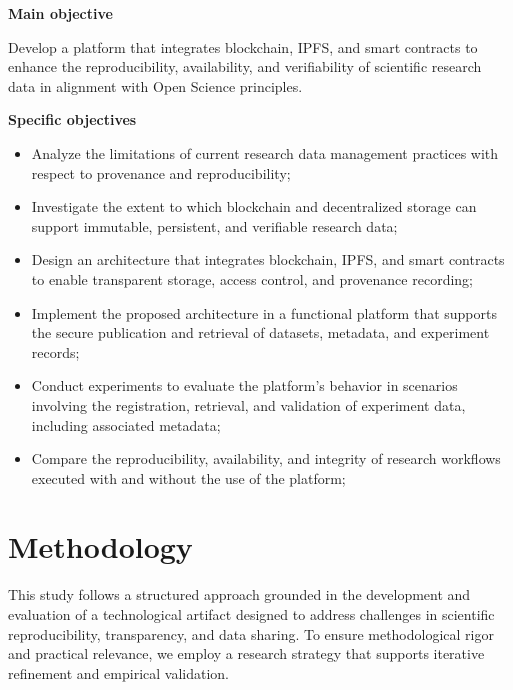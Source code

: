 \documentclass[final]{rc-book-2.14}
\begin{document}
\textbf{Main objective}

\begin{citeverbatim}

    Develop a platform that integrates blockchain, IPFS, and smart contracts to enhance the reproducibility, availability, and verifiability of scientific research data in alignment with Open Science principles.

\end{citeverbatim}

\textbf{Specific objectives}
\begin{itemize}
    \item Analyze the limitations of current research data management practices with respect to provenance and reproducibility;

    \item Investigate the extent to which blockchain and decentralized storage can support immutable, persistent, and verifiable research data;

    \item Design an architecture that integrates blockchain, IPFS, and smart contracts to enable transparent storage, access control, and provenance recording;

    \item Implement the proposed architecture in a functional platform that supports the secure publication and retrieval of datasets, metadata, and experiment records;

    \item Conduct experiments to evaluate the platform’s behavior in scenarios involving the registration, retrieval, and validation of experiment data, including associated metadata;

    \item Compare the reproducibility, availability, and integrity of research workflows executed with and without the use of the platform;

\end{itemize}

\section{Methodology}
\label{chp:intro:sec:methodology}

This study follows a structured approach grounded in the development and evaluation of a technological artifact designed to address challenges in scientific reproducibility, transparency, and data sharing. To ensure methodological rigor and practical relevance, we employ a research strategy that supports iterative refinement and empirical validation.
\end{document}
